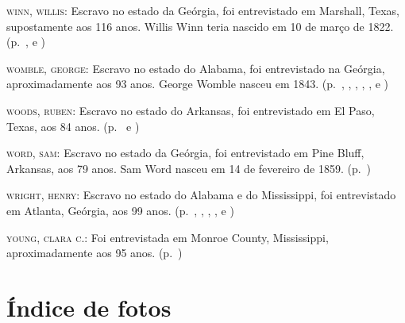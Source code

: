 \begin{Parskip}
\textsc{winn, willis:} Escravo no estado da Geórgia, foi entrevistado em
Marshall, Texas, supostamente aos 116 anos. Willis Winn teria nascido em
10 de março de 1822. (p.~\pageref{ref303}, \pageref{ref304} e \pageref{ref305})

\textsc{womble, george:} Escravo no estado do Alabama, foi entrevistado
na Geórgia, aproximadamente aos 93 anos. George Womble nasceu em 1843. (p.~\pageref{ref306}, \pageref{ref307}, \pageref{ref308}, \pageref{ref309}, \pageref{ref310}, \pageref{ref311} e \pageref{ref312})

\textsc{woods, ruben:} Escravo no estado do Arkansas, foi entrevistado
em El Paso, Texas, aos 84 anos. (p.~\pageref{ref313} e \pageref{ref314}) 

\textsc{word, sam:} Escravo no estado da Geórgia, foi entrevistado em
Pine Bluff, Arkansas, aos 79 anos. Sam Word nasceu em 14 de fevereiro de 1859. (p.~\pageref{ref315})

\textsc{wright, henry:} Escravo no estado do Alabama e do Mississippi,
foi entrevistado em Atlanta, Geórgia, aos 99 anos. (p.~\pageref{ref316}, \pageref{ref317}, \pageref{ref318}, \pageref{ref319}, \pageref{ref320} e \pageref{ref321})

\textsc{young, clara c.:} Foi entrevistada em Monroe County,
Mississippi, aproximadamente aos 95 anos. (p.~\pageref{ref322})
\end{Parskip}


\section{Índice de fotos}

